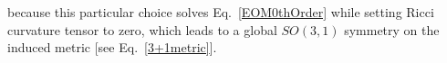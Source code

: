 \documentclass[twocolumn,aps,
  showpacs,showkeys,prd,superscriptaddress]{revtex4-1}
\begin{document}
because this particular choice solves Eq.~\eqref{EOM0thOrder} while setting Ricci curvature tensor to zero, which leads to a global $SO(3,1)$ symmetry on the induced metric [see Eq.~\eqref{3+1metric}].



\end{document}
